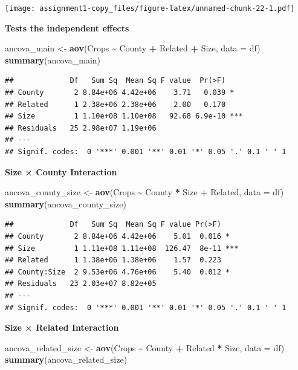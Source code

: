 \documentclass[
]{article}
\newenvironment{Shaded}{\begin{snugshade}}{\end{snugshade}}
\newcommand{\AttributeTok}[1]{\textcolor[rgb]{0.13,0.29,0.53}{#1}}
\newcommand{\FunctionTok}[1]{\textcolor[rgb]{0.13,0.29,0.53}{\textbf{#1}}}
\newcommand{\NormalTok}[1]{#1}
\newcommand{\OtherTok}[1]{\textcolor[rgb]{0.56,0.35,0.01}{#1}}
\newcommand{\SpecialCharTok}[1]{\textcolor[rgb]{0.81,0.36,0.00}{\textbf{#1}}}
\begin{document}
\texttt{[image: assignment1-copy\_files/figure-latex/unnamed-chunk-22-1.pdf]}

\textbf{Tests the independent effects}

\begin{Shaded}
\begin{Highlighting}[]
\NormalTok{ancova\_main }\OtherTok{\textless{}{-}} \FunctionTok{aov}\NormalTok{(Crops }\SpecialCharTok{\textasciitilde{}}\NormalTok{ County }\SpecialCharTok{+}\NormalTok{ Related }\SpecialCharTok{+}\NormalTok{ Size, }\AttributeTok{data =}\NormalTok{ df)}
\FunctionTok{summary}\NormalTok{(ancova\_main)}
\end{Highlighting}
\end{Shaded}

\begin{verbatim}
##             Df   Sum Sq  Mean Sq F value  Pr(>F)    
## County       2 8.84e+06 4.42e+06    3.71   0.039 *  
## Related      1 2.38e+06 2.38e+06    2.00   0.170    
## Size         1 1.10e+08 1.10e+08   92.68 6.9e-10 ***
## Residuals   25 2.98e+07 1.19e+06                    
## ---
## Signif. codes:  0 '***' 0.001 '**' 0.01 '*' 0.05 '.' 0.1 ' ' 1
\end{verbatim}

\textbf{Size × County Interaction}

\begin{Shaded}
\begin{Highlighting}[]
\NormalTok{ancova\_county\_size }\OtherTok{\textless{}{-}} \FunctionTok{aov}\NormalTok{(Crops }\SpecialCharTok{\textasciitilde{}}\NormalTok{ County }\SpecialCharTok{*}\NormalTok{ Size }\SpecialCharTok{+}\NormalTok{ Related, }\AttributeTok{data =}\NormalTok{ df)}
\FunctionTok{summary}\NormalTok{(ancova\_county\_size)}
\end{Highlighting}
\end{Shaded}

\begin{verbatim}
##             Df   Sum Sq  Mean Sq F value Pr(>F)    
## County       2 8.84e+06 4.42e+06    5.01  0.016 *  
## Size         1 1.11e+08 1.11e+08  126.47  8e-11 ***
## Related      1 1.38e+06 1.38e+06    1.57  0.223    
## County:Size  2 9.53e+06 4.76e+06    5.40  0.012 *  
## Residuals   23 2.03e+07 8.82e+05                   
## ---
## Signif. codes:  0 '***' 0.001 '**' 0.01 '*' 0.05 '.' 0.1 ' ' 1
\end{verbatim}

\textbf{Size × Related Interaction}

\begin{Shaded}
\begin{Highlighting}[]
\NormalTok{ancova\_related\_size }\OtherTok{\textless{}{-}} \FunctionTok{aov}\NormalTok{(Crops }\SpecialCharTok{\textasciitilde{}}\NormalTok{ County }\SpecialCharTok{+}\NormalTok{ Related }\SpecialCharTok{*}\NormalTok{ Size, }\AttributeTok{data =}\NormalTok{ df)}
\FunctionTok{summary}\NormalTok{(ancova\_related\_size)}
\end{Highlighting}
\end{Shaded}
\end{document}
